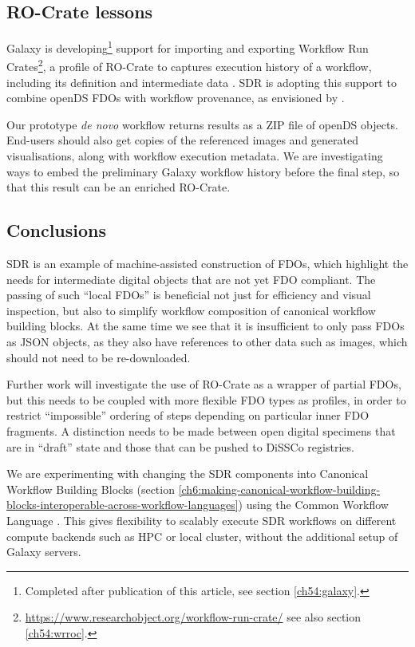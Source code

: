 \subsection{RO-Crate lessons}\label{ch7:ro-crate-lessons}

Galaxy is developing\footnote{
    Completed after publication of this article, see section \vref{ch54:galaxy}.
} support for importing and
exporting Workflow
Run Crates\footnote{\url{https://www.researchobject.org/workflow-run-crate/} see also section \vref{ch54:wrroc}.}, a profile of RO-Crate \cite{Soiland-Reyes 2022} to
captures execution history of a workflow, including its definition and
intermediate data \cite{De Geest 2022}. SDR is adopting this support to
combine openDS FDOs with workflow provenance, as envisioned by
\cite{Walton 2020}.

Our prototype \emph{de novo} workflow returns results as a ZIP file of
openDS objects. End-users should also get copies of the referenced
images and generated visualisations, along with workflow execution
metadata. We are investigating ways to embed the preliminary Galaxy
workflow history before the final step, so that this result can be an
enriched RO-Crate.

\subsection{Conclusions}\label{ch7:conclusions}

SDR is an example of machine-assisted construction of FDOs, which
highlight the needs for intermediate digital objects that are not yet
FDO compliant. The passing of such ``local FDOs'' is beneficial not just
for efficiency and visual inspection, but also to simplify workflow
composition of canonical workflow building blocks. At the same time we
see that it is insufficient to only pass FDOs as JSON objects, as they
also have references to other data such as images, which should not need
to be re-downloaded.

Further work will investigate the use of RO-Crate as a wrapper of
partial FDOs, but this needs to be coupled with more flexible FDO types
as profiles, in order to restrict ``impossible'' ordering of steps
depending on particular inner FDO fragments. A distinction needs to be
made between open digital specimens that are in ``draft'' state and
those that can be pushed to DiSSCo registries.

We are experimenting with changing the SDR components into Canonical
Workflow Building Blocks \cite{Soiland-Reyes 2022b}
(section \vref{ch6:making-canonical-workflow-building-blocks-interoperable-across-workflow-languages}) 
using the Common Workflow Language \cite{Crusoe 2022}. This gives
flexibility to scalably execute SDR workflows on different compute
backends such as HPC or local cluster, without the additional setup of
Galaxy servers.

